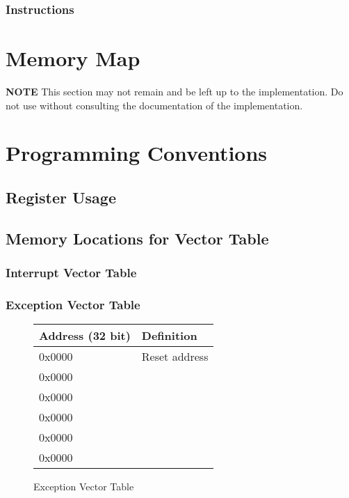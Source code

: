 \documentclass[letterpaper, 11pt]{article}
\begin{document}
\subsubsection{Instructions}

\section{Memory Map}
\textbf{NOTE}
This section may not remain and be left up to the implementation. Do not use without consulting
the documentation of the implementation.
\section{Programming Conventions}
\subsection{Register Usage}
\subsection{Memory Locations for Vector Table}
\subsubsection{Interrupt Vector Table}
\subsubsection{Exception Vector Table}


\begin{figure}[!h]
	\begin{center}
		\begin{tabular}{|l|l|}
			\hline
			Address (32 bit) &  Definition\\ \hline
			0x0000 & Reset address \\ 	\hline
			0x0000 &  \\ 	\hline
			0x0000 &  \\ 	\hline
			0x0000 &  \\ 	\hline
			0x0000 &  \\ 	\hline
			0x0000 &  \\	\hline
		\end{tabular} 
		\caption{Exception Vector Table}
	\end{center}
	
\end{figure}
\end{document}
